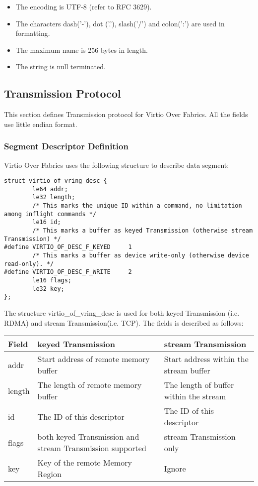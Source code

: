 \begin{itemize}
\item The encoding is UTF-8 (refer to RFC 3629).
\item The characters dash('-'), dot ('.'), slash('/') and colon(':') are used
in formatting.
\item The maximum name is 256 bytes in length.
\item The string is null terminated.
\end{itemize}

\subsection{Transmission Protocol}\label{sec:Virtio Transport Options / Virtio Over Fabrics / Transmission Protocol}
This section defines Transmission protocol for Virtio Over Fabrics. All the
fields use little endian format.

\subsubsection{Segment Descriptor Definition}\label{sec:Virtio Transport Options / Virtio Over Fabrics / Transmission Protocol / Segment Descriptor Definition}
Virtio Over Fabrics uses the following structure to describe data segment:

\begin{lstlisting}
struct virtio_of_vring_desc {
        le64 addr;
        le32 length;
        /* This marks the unique ID within a command, no limitation among inflight commands */
        le16 id;
        /* This marks a buffer as keyed Transmission (otherwise stream Transmission) */
#define VIRTIO_OF_DESC_F_KEYED     1
        /* This marks a buffer as device write-only (otherwise device read-only). */
#define VIRTIO_OF_DESC_F_WRITE     2
        le16 flags;
        le32 key;
};
\end{lstlisting}

The structure virtio_of_vring_desc is used for both keyed Transmission
(i.e. RDMA) and stream Transmission(i.e. TCP). The fields is described as follows:

\begin{tabular}{ |l|l|l| }
\hline
Field & keyed Transmission & stream Transmission \\
\hline \hline
addr & Start address of remote memory buffer & Start address within the stream buffer \\
\hline
length & The length of remote memory buffer & The length of buffer within the stream \\
\hline
id & The ID of this descriptor & The ID of this descriptor \\
\hline
flags & both keyed Transmission and stream Transmission supported & stream Transmission only \\
\hline
key & Key of the remote Memory Region & Ignore \\
\hline
\end{tabular}

